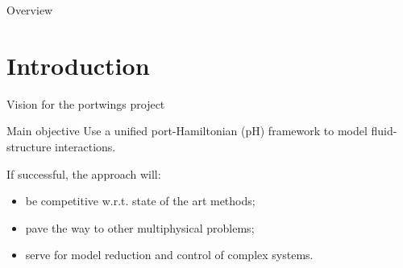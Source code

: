 \documentclass[aspectratio=169]{beamer}
\begin{document}
	



\begin{frame}[plain]


    
\end{frame}

\begin{frame}{Overview}
	\tableofcontents
\end{frame}

\section{Introduction}

\begin{frame}{Vision for the portwings project}

\begin{block}{Main objective}
Use a unified port-Hamiltonian (pH) framework to model fluid-structure interactions.
\end{block}

If successful, the approach will: 
\begin{itemize}
	\item be competitive w.r.t. state of the art methods;
	\item pave the way to other multiphysical problems;
	\item serve for model reduction and control of complex systems.
\end{itemize}


\end{frame}
\end{document}
